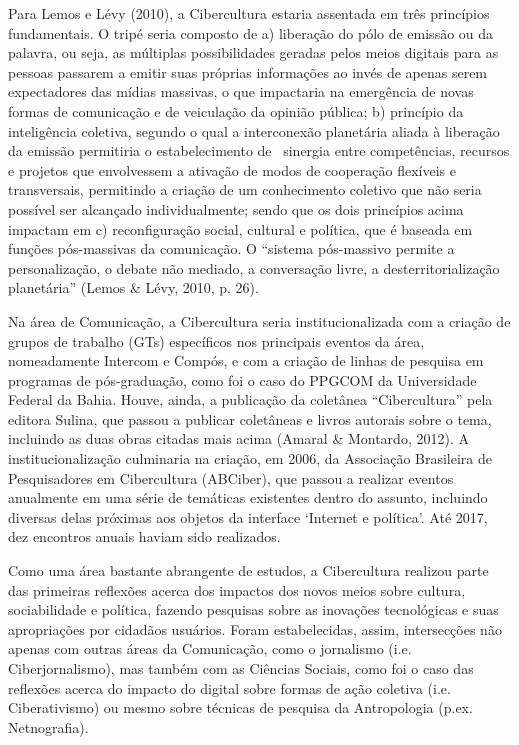 Para Lemos e Lévy (2010), a Cibercultura estaria assentada em três
princípios fundamentais. O tripé seria composto de a) liberação do pólo
de emissão ou da palavra, ou seja, as múltiplas possibilidades geradas
pelos meios digitais para as pessoas passarem a emitir suas próprias
informações ao invés de apenas serem expectadores das mídias massivas, o
que impactaria na emergência de novas formas de comunicação e de
veiculação da opinião pública; b) princípio da inteligência coletiva,
segundo o qual a interconexão planetária aliada à liberação da emissão
permitiria o estabelecimento de ~sinergia entre competências, recursos e
projetos que envolvessem a ativação de modos de cooperação flexíveis e
transversais, permitindo a criação de um conhecimento coletivo que não
seria possível ser alcançado individualmente; sendo que os dois
princípios acima impactam em c) reconfiguração social, cultural e
política, que é baseada em funções pós-massivas da comunicação. O
``sistema pós-massivo permite a personalização, o debate não mediado, a
conversação livre, a desterritorialização planetária'' (Lemos \& Lévy,
2010, p. 26).

Na área de Comunicação, a Cibercultura seria institucionalizada com a
criação de grupos de trabalho (GTs) específicos nos principais eventos
da área, nomeadamente Intercom e Compós, e com a criação de linhas de
pesquisa em programas de pós-graduação, como foi o caso do PPGCOM da
Universidade Federal da Bahia. Houve, ainda, a publicação da coletânea
``Cibercultura'' pela editora Sulina, que passou a publicar coletâneas e
livros autorais sobre o tema, incluindo as duas obras citadas mais acima
(Amaral \& Montardo, 2012). A institucionalização culminaria na criação,
em 2006, da Associação Brasileira de Pesquisadores em Cibercultura
(ABCiber), que passou a realizar eventos anualmente em uma série de
temáticas existentes dentro do assunto, incluindo diversas delas
próximas aos objetos da interface `Internet e política'. Até 2017, dez
encontros anuais haviam sido realizados.

Como uma área bastante abrangente de estudos, a Cibercultura realizou
parte das primeiras reflexões acerca dos impactos dos novos meios sobre
cultura, sociabilidade e política, fazendo pesquisas sobre as inovações
tecnológicas e suas apropriações por cidadãos usuários. Foram
estabelecidas, assim, intersecções não apenas com outras áreas da
Comunicação, como o jornalismo (i.e. Ciberjornalismo), mas também com as
Ciências Sociais, como foi o caso das reflexões acerca do impacto do
digital sobre formas de ação coletiva (i.e. Ciberativismo) ou mesmo
sobre técnicas de pesquisa da Antropologia (p.ex. Netnografia).

